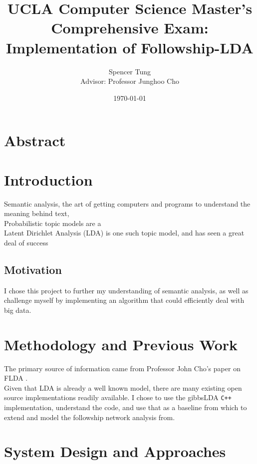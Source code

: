 \documentclass[a4paper]{article}
\title{UCLA Computer Science Master's Comprehensive Exam: Implementation of Followship-LDA}
\author{Spencer Tung \\ Advisor: Professor Junghoo Cho}
\date{\today}
\begin{document}
\maketitle

\section{Abstract}

\section{Introduction}
Semantic analysis, the art of getting computers and programs to understand the meaning behind text, \\
Probabilistic topic models are a \\
Latent Dirichlet Analysis (LDA) is one such topic model, and has seen a great deal of success 

\subsection{Motivation}
I chose this project to further my understanding of semantic analysis, as well as challenge myself by implementing an algorithm that could efficiently deal with big data.


\section{Methodology and Previous Work}
The primary source of information came from Professor John Cho's paper on FLDA \cite{flda}.  \\

Given that LDA is already a well known model, there are many existing open source implementations readily available. I chose to use the gibbsLDA \verb!C++! implementation, understand the code, and use that as a baseline from which to extend and model the followship network analysis from.

\section{System Design and Approaches}
\end{document}
